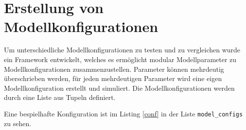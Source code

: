 



\section{Erstellung von Modellkonfigurationen}

Um unterschiedliche Modellkonfigurationen zu testen und zu vergleichen wurde ein Framework entwickelt, welches es ermöglicht modular Modellparameter zu Modellkonfigurationen zusammenzustellen. Parameter können mehrdeutig überschrieben werden, für jeden mehrdeutigen Parameter wird eine eigen Modellkonfiguration erstellt und simuliert. Die Modellkonfigurationen werden durch eine Liste aus Tupeln definiert. 

Eine bespielhafte Konfiguration ist im Listing \ref{conf} in der Liste \texttt{model\_configs} zu sehen.

\lstset{basicstyle=\ttfamily, numbers=left, numberstyle = \tiny, stepnumber = 2}

